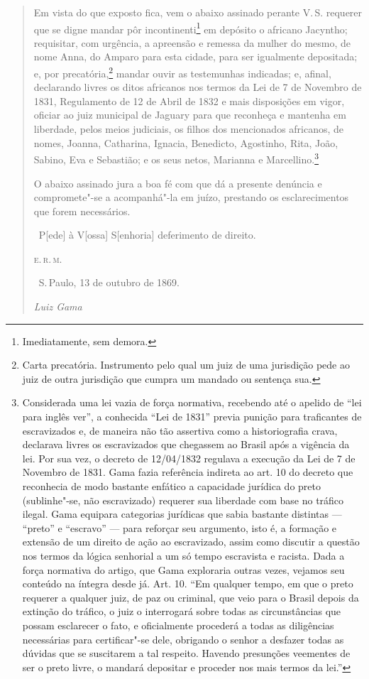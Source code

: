 \begin{quote}
Em vista do que exposto fica, vem o abaixo assinado perante V.\,S.
requerer que se digne mandar pôr incontinenti\footnote{Imediatamente,
  sem demora.} em depósito o africano Jacyntho; requisitar, com
urgência, a apreensão e remessa da mulher do mesmo, de nome Anna, do
Amparo para esta cidade, para ser igualmente depositada; e, por
precatória,\footnote{Carta precatória. Instrumento pelo qual um juiz de
  uma jurisdição pede ao juiz de outra jurisdição que cumpra um mandado
  ou sentença sua.} mandar ouvir as testemunhas indicadas; e, afinal,
declarando livres os ditos africanos nos termos da Lei de 7 de Novembro
de 1831, Regulamento de 12 de Abril de 1832 e mais disposições em vigor,
oficiar ao juiz municipal de Jaguary para que reconheça e mantenha em
liberdade, pelos meios judiciais, os filhos dos mencionados africanos,
de nomes, Joanna, Catharina, Ignacia, Benedicto, Agostinho, Rita, João,
Sabino, Eva e Sebastião; e os seus netos, Marianna e
Marcellino.\footnote{Considerada uma lei vazia de força normativa,
  recebendo até o apelido de ``lei para inglês ver'', a conhecida ``Lei de
  1831'' previa punição para traficantes de escravizados e, de maneira
  não tão assertiva como a historiografia crava, declarava livres os
  escravizados que chegassem ao Brasil após a vigência da lei. Por sua
  vez, o decreto de 12/04/1832 regulava a execução da Lei de 7 de
  Novembro de 1831. Gama fazia referência indireta ao art.
  10 do decreto que reconhecia de modo bastante enfático a capacidade
  jurídica do preto (sublinhe"-se, não escravizado) requerer sua
  liberdade com base no tráfico ilegal. Gama equipara categorias
  jurídicas que sabia bastante distintas --- ``preto'' e ``escravo'' --- para
  reforçar seu argumento, isto é, a formação e extensão de um direito de
  ação ao escravizado, assim como discutir a questão nos termos da
  lógica senhorial a um só tempo escravista e racista. Dada a força
  normativa do artigo, que Gama exploraria outras vezes, vejamos seu conteúdo na
  íntegra desde já. Art. 10. ``Em qualquer tempo, em que o preto requerer
  a qualquer juiz, de paz ou criminal, que veio para o Brasil depois da
  extinção do tráfico, o juiz o interrogará sobre todas as
  circunstâncias que possam esclarecer o fato, e oficialmente procederá
  a todas as diligências necessárias para certificar"-se dele, obrigando
  o senhor a desfazer todas as dúvidas que se suscitarem a tal respeito.
  Havendo presunções veementes de ser o preto livre, o mandará depositar
  e proceder nos mais termos da lei.''}

O abaixo assinado jura a boa fé com que dá a presente denúncia e
compromete"-se a acompanhá"-la em juízo, prestando os esclarecimentos que
forem necessários.

\hfill\ P{[}ede{]} à V{[}ossa{]} S{[}enhoria{]} deferimento de direito.

\hfill\textsc{e.\,r.\,m.}

\medskip

\hfill\ S.\,Paulo, 13 de outubro de 1869.\smallskip

\hfill\emph{Luiz Gama}
\end{quote}

